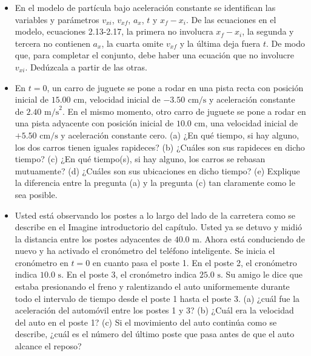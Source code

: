 \documentclass[11pt,a4paper]{article}
\begin{document}
\newpage

\begin{itemize}
    \item[\textbf{22.}] En el modelo de partícula bajo aceleración constante se identifican las variables y parámetros $v_{xi}$, $v_{xf}$, $a_x$, $t$ y $x_f - x_i$. De las ecuaciones en el modelo, ecuaciones 2.13-2.17, la primera no involucra $x_f - x_i$, la segunda y tercera no contienen $a_x$, la cuarta omite $v_{xf}$ y la última deja fuera $t$. De modo que, para completar el conjunto, debe haber una ecuación que no involucre $v_{xi}$. Dedúzcala a partir de las otras.
    \vspace*{6cm}

    \item[\textbf{23.}] En $t = 0$, un carro de juguete se pone a rodar en una pista recta con posición inicial de $15.00 \text{ cm}$, velocidad inicial de $-3.50 \text{ cm/s}$ y aceleración constante de $2.40 \text{ m/s}^2$. En el mismo momento, otro carro de juguete se pone a rodar en una pista adyacente con posición inicial de $10.0 \text{ cm}$, una velocidad inicial de $+5.50 \text{ cm/s}$ y aceleración constante cero. (a) ¿En qué tiempo, si hay alguno, los dos carros tienen iguales rapideces? (b) ¿Cuáles son sus rapideces en dicho tiempo? (c) ¿En qué tiempo(s), si hay alguno, los carros se rebasan mutuamente? (d) ¿Cuáles son sus ubicaciones en dicho tiempo? (e) Explique la diferencia entre la pregunta (a) y la pregunta (c) tan claramente como le sea posible.
    \vspace*{8cm}

    \item[\textbf{24.}] Usted está observando los postes a lo largo del lado de la carretera como se describe en el Imagine introductorio del capítulo. Usted ya se detuvo y midió la distancia entre los postes adyacentes de $40.0 \text{ m}$. Ahora está conduciendo de nuevo y ha activado el cronómetro del teléfono inteligente. Se inicia el cronómetro en $t = 0$ en cuanto pasa el poste 1. En el poste 2, el cronómetro indica $10.0 \text{ s}$. En el poste 3, el cronómetro indica $25.0 \text{ s}$. Su amigo le dice que estaba presionando el freno y ralentizando el auto uniformemente durante todo el intervalo de tiempo desde el poste 1 hasta el poste 3. (a) ¿cuál fue la aceleración del automóvil entre los postes 1 y 3? (b) ¿Cuál era la velocidad del auto en el poste 1? (c) Si el movimiento del auto continúa como se describe, ¿cuál es el número del último poste que pasa antes de que el auto alcance el reposo?
    \vspace*{8cm}
\end{itemize}
\end{document}
